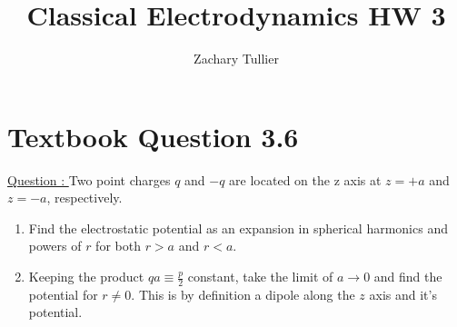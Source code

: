 \documentclass[12pt]{article}
\begin{document}
\singlespacing  %
\title{Classical Electrodynamics HW 3}

\author[1]{Zachary Tullier}

\maketitle


\section{Textbook Question 3.6} \label{section1}
    \underline{Question : }
    Two point charges $q$ and $-q$ are located on the z axis at $z = +a$ and $z = -a$, respectively.
    \begin{enumerate}
        \item [a)] Find the electrostatic potential as an expansion in spherical harmonics and powers of $r$ for both $r>a$ and $r<a$.
        \item [b)] Keeping the product $qa \equiv \frac{p}{2}$ constant, take the limit of $a \rightarrow{} 0$ and find the potential for $r \neq 0$. This is by definition a dipole along the $z$ axis and it's potential. 
    \end{enumerate}
\end{document}
